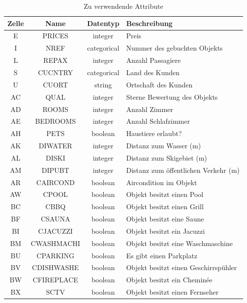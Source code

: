 \begin{table}[H] 
	\caption{Zu verwendende Attribute}
	\centering
	\label{fig:recherche:attributeinschraenkung:2}
	\begin{tabular}{ | c | c | c | l | } 
		\hline 
		\rowcolor{tableheadcolor}
		\bfseries Zelle & \bfseries Name & \bfseries Datentyp & \bfseries Beschreibung \\ \hline 
		E & PRICES & integer & Preis \\ \hline 
		I & NREF & categorical & Nummer des gebuchten Objekts \\ \hline 
		L & REPAX & integer & Anzahl Passagiere \\ \hline 
		S & CUCNTRY & categorical & Land des Kunden \\ \hline 
		U & CUORT & string & Ortschaft des Kunden \\ \hline 
		AC & QUAL & integer & Sterne Bewertung des Objekts \\ \hline 
		AD & ROOMS & integer & Anzahl Zimmer \\ \hline 
		AE & BEDROOMS & integer & Anzahl Schlafzimmer \\ \hline 
		AH & PETS & boolean & Haustiere erlaubt? \\ \hline 
		AK & DIWATER & integer & Distanz zum Wasser (m) \\ \hline 
		AL & DISKI & integer & Distanz zum Skigebiet (m) \\ \hline 
		AM & DIPUBT & integer & Distanz zum öffentlichen Verkehr (m) \\ \hline 
		AR & CAIRCOND & boolean & Aircondition im Objekt\\ \hline 
		AW & CPOOL & boolean & Objekt besitzt einen Pool \\ \hline 
		BC & CBBQ & boolean & Objekt besitzt einen Grill \\ \hline 
		BF & CSAUNA & boolean & Objekt besitzt eine Saune \\ \hline 
		BI & CJACUZZI & boolean & Objekt besitzt ein Jacuzzi \\ \hline 
		BM & CWASHMACHI & boolean & Objekt besitzt eine Waschmaschine \\ \hline 
		BU & CPARKING & boolean & Es gibt einen Parkplatz \\ \hline 
		BV & CDISHWASHE & boolean & Objekt besitzt einen Geschirrspühler \\ \hline
		BW & CFIREPLACE & boolean & Objekt besitzt ein Cheminée \\ \hline 
		BX & SCTV & boolean & Objekt besitzt einen Fernseher \\ \hline  

\end{tabular}
\end{table}
